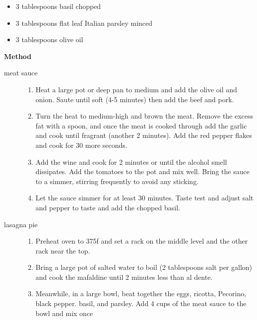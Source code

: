 \documentclass[web-recipes.tex]{subfiles}
\begin{document}
\begin{mdframed}[nobreak]
\begin{minipage}[t]{0.35\textwidth}
\begin{description}
\begin{itemize}
          \item 3 tablespoons basil chopped
          \item 3 tablespoons flat leaf Italian parsley minced
          \item 3 tablespoons olive oil
        \end{itemize}
    \end{description}
  \end{minipage}
  \qquad
  \begin{minipage}[t]{0.55\textwidth}
    {\sffamily\bfseries Method}\vspace{0.5ex}
    \begin{description}
      \item[meat sauce]\hfill
        \begin{enumerate}
          \item Heat a large pot or deep pan to medium and add the
            olive oil and onion. Saute until soft (4-5 minutes)
            then add the beef and pork.
          \item Turn the heat to medium-high and brown the meat.
            Remove the excess fat with a spoon, and once the meat
            is cooked through add the garlic and cook until
            fragrant (another 2 minutes). Add the red pepper flakes
            and cook for 30 more seconds.
          \item Add the wine and cook for 2 minutes or until the
            alcohol smell dissipates. Add the tomatoes to the pot
            and mix well. Bring the sauce to a simmer, stirring
            frequently to avoid any sticking.
          \item Let the sauce simmer for at least 30 minutes. Taste
            test and adjust salt and pepper to taste and add the
            chopped basil.
        \end{enumerate}
      \item[lasagna pie]\hfill
        \begin{enumerate}
          \item Preheat oven to 375f and set a rack on the middle
            level and the other rack near the top.
          \item Bring a large pot of salted water to boil (2
            tablespoons salt per gallon) and cook the mafaldine
            until 2 minutes less than al dente.
          \item Meanwhile, in a large bowl, beat together the eggs,
            ricotta, Pecorino, black pepper. basil, and parsley.
            Add 4 cups of the meat sauce to the bowl and mix once

\end{enumerate}
\end{description}
\end{minipage}
\end{mdframed}
\end{document}

